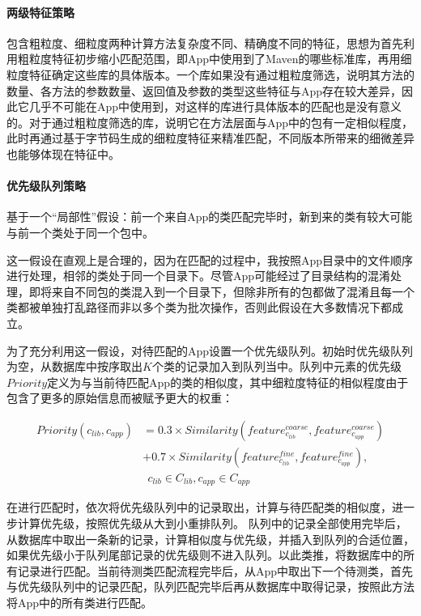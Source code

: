 \paragraph{两级特征策略}包含粗粒度、细粒度两种计算方法复杂度不同、精确度不同的特征，思想为首先利用粗粒度特征初步缩小匹配范围，即App中使用到了Maven的哪些标准库，再用细粒度特征确定这些库的具体版本。一个库如果没有通过粗粒度筛选，说明其方法的数量、各方法的参数数量、返回值及参数的类型这些特征与App存在较大差异，因此它几乎不可能在App中使用到，对这样的库进行具体版本的匹配也是没有意义的。对于通过粗粒度筛选的库，说明它在方法层面与App中的包有一定相似程度，此时再通过基于字节码生成的细粒度特征来精准匹配，不同版本所带来的细微差异也能够体现在特征中。

\paragraph{优先级队列策略}基于一个“局部性”假设：{\kaishu 前一个来自App的类匹配完毕时，新到来的类有较大可能与前一个类处于同一个包中}。


这一假设在直观上是合理的，因为在匹配的过程中，我按照App目录中的文件顺序进行处理，相邻的类处于同一个目录下。尽管App可能经过了目录结构的混淆处理，即将来自不同包的类混入到一个目录下，但除非所有的包都做了混淆且每一个类都被单独打乱路径而非以多个类为批次操作，否则此假设在大多数情况下都成立。


为了充分利用这一假设，对待匹配的App设置一个优先级队列。初始时优先级队列为空，从数据库中按序取出$K$个类的记录加入到队列当中。队列中元素的优先级$Priority$定义为与当前待匹配App的类的相似度，其中细粒度特征的相似程度由于包含了更多的原始信息而被赋予更大的权重：

\begin{equation}
\begin{aligned}
Priority(c_{lib},c_{app})&=0.3\times Similarity(feature^{coarse}_{c_{lib}},feature^{coarse}_{c_{app}})\\
						 &+0.7\times Similarity(feature^{fine}_{c_{lib}},feature^{fine}_{c_{app}}),\\
						 &\ \ c_{lib}\in C_{lib}, c_{app}\in C_{app}
\end{aligned}
\end{equation}


在进行匹配时，依次将优先级队列中的记录取出，计算与待匹配类的相似度，进一步计算优先级，按照优先级从大到小重排队列。
队列中的记录全部使用完毕后，从数据库中取出一条新的记录，计算相似度与优先级，并插入到队列的合适位置，如果优先级小于队列尾部记录的优先级则不进入队列。以此类推，将数据库中的所有记录进行匹配。当前待测类匹配流程完毕后，从App中取出下一个待测类，首先与优先级队列中的记录匹配，队列匹配完毕后再从数据库中取得记录，按照此方法将App中的所有类进行匹配。

